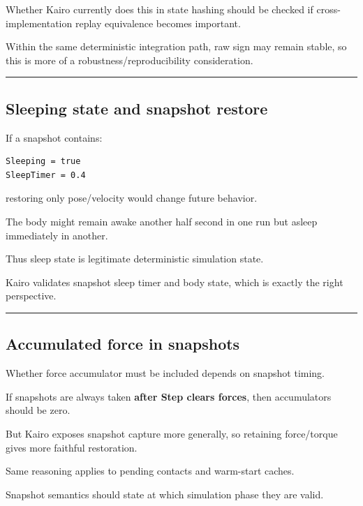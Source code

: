 Whether Kairo currently does this in state hashing should be checked if cross-implementation replay equivalence becomes important.

Within the same deterministic integration path, raw sign may remain stable, so this is more of a robustness/reproducibility consideration.

\begin{center}\rule{0.5\linewidth}{0.5pt}\end{center}

\subsection{Sleeping state and snapshot restore}\label{06-engine-ii-ch038-sleeping-state-and-snapshot-restore}

If a snapshot contains:

\begin{verbatim}
Sleeping = true
SleepTimer = 0.4
\end{verbatim}

restoring only pose/velocity would change future behavior.

The body might remain awake another half second in one run but asleep immediately in another.

Thus sleep state is legitimate deterministic simulation state.

Kairo validates snapshot sleep timer and body state, which is exactly the right perspective.

\begin{center}\rule{0.5\linewidth}{0.5pt}\end{center}

\subsection{Accumulated force in snapshots}\label{06-engine-ii-ch038-accumulated-force-in-snapshots}

Whether force accumulator must be included depends on snapshot timing.

If snapshots are always taken \textbf{after Step clears forces}, then accumulators should be zero.

But Kairo exposes snapshot capture more generally, so retaining force/torque gives more faithful restoration.

Same reasoning applies to pending contacts and warm-start caches.

Snapshot semantics should state at which simulation phase they are valid.

